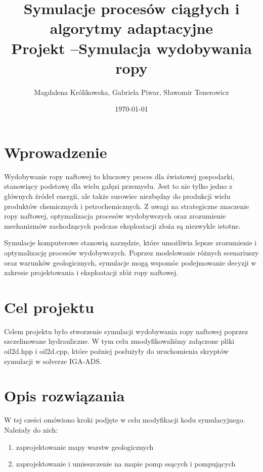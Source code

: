 \documentclass[onecolumn,12pt]{article}
\begin{document}
\title{Symulacje procesów ciągłych i algorytmy adaptacyjne\\
Projekt –Symulacja wydobywania ropy}
\author{Magdalena Królikowska, Gabriela Piwar, Sławomir Tenerowicz}
\date{\today}
\maketitle

\tableofcontents
\thispagestyle{empty}

\section{Wprowadzenie}

 Wydobywanie ropy naftowej to kluczowy proces dla światowej gospodarki, stanowiący podstawę dla wielu gałęzi przemysłu. Jest to nie tylko jedno z głównych źródeł energii, ale także surowiec niezbędny do produkcji wielu produktów chemicznych i petrochemicznych. Z uwagi na strategiczne znaczenie ropy naftowej, optymalizacja procesów wydobywczych oraz zrozumienie mechanizmów zachodzących podczas eksploatacji złoża są niezwykle istotne.

Symulacje komputerowe stanowią narzędzie, które umożliwia lepsze zrozumienie i optymalizację procesów wydobywczych. Poprzez modelowanie różnych scenariuszy oraz warunków geologicznych, symulacje mogą wspomóc podejmowanie decyzji w zakresie projektowania i eksploatacji złóż ropy naftowej.

\section{Cel projektu}

Celem projektu było stworzenie symulacji wydobywania ropy naftowej poprzez
szczelinowane hydrauliczne. W tym celu zmodyfikowaliśmy załączone pliki oil2d.hpp i oil2d.cpp, które poźniej posłużyły do uruchomienia skryptów symulacji
w solverze IGA-ADS.
        
\section{Opis rozwiązania}

W tej cześci omówiono kroki podjęte w celu modyfikacji kodu symulacyjnego. Należały do nich:  
\begin{enumerate}
    \item zaprojektowanie mapy warstw geologicznych 
    \item zaprojektowanie i umieszczenie na mapie pomp ssących i pompujących 
\end{enumerate}
\end{document}
